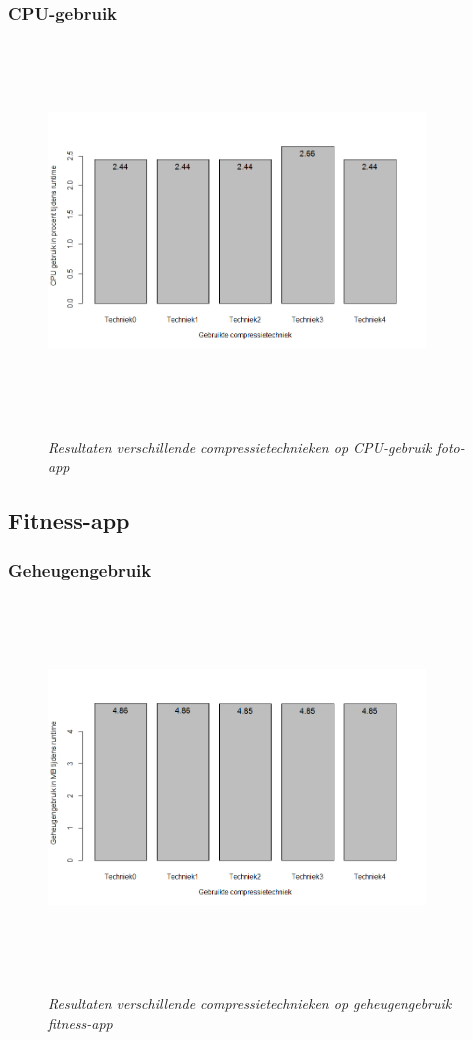 \subsubsection{CPU-gebruik}
\begin{figure}[H]
	\centering
	\caption{\textit{Resultaten verschillende compressietechnieken op CPU-gebruik foto-app}}
	\includegraphics[width=10cm, height=10cm, keepaspectratio]{img/app1cpu}\\[.5cm]
	
\end{figure}
\subsection{Fitness-app}
\subsubsection{Geheugengebruik}
\begin{figure}[H]
	\centering
	\caption{\textit{Resultaten verschillende compressietechnieken op geheugengebruik fitness-app}}
	\includegraphics[width=10cm, height=10cm, keepaspectratio]{img/app2geheugen}\\[.5cm]
	
\end{figure}

